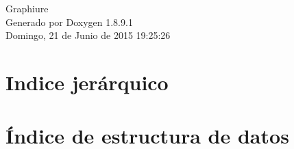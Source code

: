 \documentclass[twoside]{book}
\newcommand{\+}{\discretionary{\mbox{\scriptsize$\hookleftarrow$}}{}{}}
\newcommand{\clearemptydoublepage}{%
  \newpage{\pagestyle{empty}\cleardoublepage}%
}
\begin{document}
\hypersetup{pageanchor=false,
             bookmarks=true,
             bookmarksnumbered=true,
             pdfencoding=unicode
            }
\begin{titlepage}
\vspace*{7cm}
\begin{center}%
{\Large Graphiure }\\
\vspace*{1cm}
{\large Generado por Doxygen 1.8.9.1}\\
\vspace*{0.5cm}
{\small Domingo, 21 de Junio de 2015 19:25:26}\\
\end{center}
\end{titlepage}
\clearemptydoublepage
\tableofcontents
\clearemptydoublepage
{}
\hypersetup{pageanchor=true}

\chapter{Indice jerárquico}

\chapter{Índice de estructura de datos}

\end{document}
